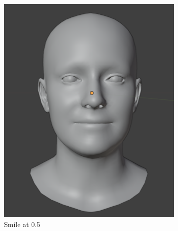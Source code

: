 \documentclass[../../main.tex]{subfiles}
\begin{document}
\begin{figure}[h]
  \hfill 
  \begin{subfigure}{0.3\linewidth} 
      \includegraphics[width=\linewidth]{chapters/background_work/images/blendshapes_example/blendshapes_example_2.png} 
      \caption{Smile at 0.5} 
  \end{subfigure} 
  \hfill 
  \begin{subfigure}{0.3\linewidth} 

\end{subfigure}
\end{figure}
\end{document}
